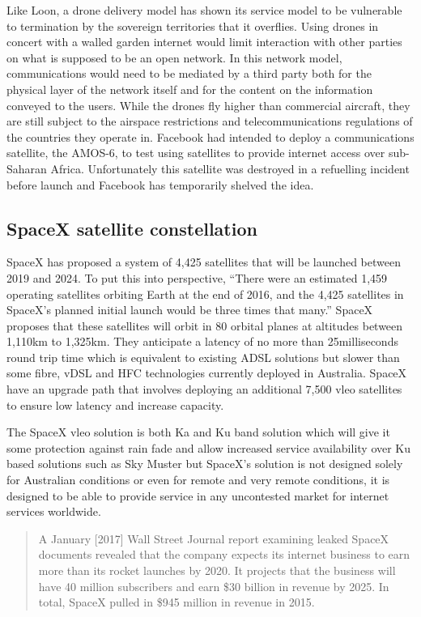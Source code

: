Like Loon, a drone delivery  model has shown its service model to be vulnerable to termination by the sovereign territories that it overflies. Using drones in concert with a walled garden internet would limit interaction with other parties on what is supposed to be an open network. In this network model, communications would need to be mediated by a third party both for the physical layer of the network itself and for the content on the information conveyed to the users. While the drones fly higher than commercial aircraft, they are still subject to the airspace restrictions and telecommunications regulations of the countries they operate in. Facebook had intended to deploy a communications satellite, the AMOS-6, to test using satellites to provide internet access over sub-Saharan Africa. Unfortunately this satellite was destroyed in a refuelling incident before launch\cite{RefWorks:460} and Facebook has temporarily shelved the idea. 


\subsection{SpaceX satellite constellation}
SpaceX has proposed a system of 4,425 satellites that will be launched between 2019 and 2024. To put this into perspective, ``There were an estimated 1,459 operating satellites orbiting Earth at the end of 2016, and the 4,425 satellites in SpaceX's planned initial launch would be three times that many\cite{RefWorks:343}.'' SpaceX proposes that these satellites will orbit in 80 orbital planes at altitudes between 1,110km to 1,325km. They anticipate a latency of no more than 25milliseconds round trip time which is equivalent to existing ADSL solutions but slower than some fibre, vDSL and HFC technologies currently deployed in Australia. SpaceX have an upgrade path that involves deploying an additional 7,500 \gls{vleo} satellites to ensure low latency and increase capacity.
 
The SpaceX \gls{vleo} solution is both Ka and Ku band solution which will give it some protection against rain fade and allow increased service availability over Ku based solutions such as Sky Muster but SpaceX's solution is not designed solely for Australian conditions or even for remote and very remote conditions, it is designed to be able to provide service in any uncontested market for internet services worldwide. 
\begin{quotation}
A January [2017] Wall Street Journal report examining leaked SpaceX documents revealed that the company expects its internet business to earn more than its rocket launches by 2020. It projects that the business will have 40 million subscribers and earn \$30 billion in revenue by 2025. In total, SpaceX pulled in \$945 million in revenue in 2015\cite{RefWorks:347}.
\end{quotation}


